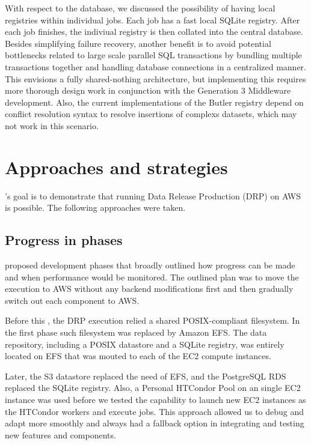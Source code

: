 With respect to the database, we discussed the possibility of having local registries within individual jobs.
Each job has a fast local SQLite registry.
After each job finishes, the indiviual registry is then collated into the central database.
Besides simplifying failure recovery, another benefit is to avoid potential bottlenecks related to large scale parallel SQL transactions by bundling multiple transactions together and handling database connections in a centralized manner.
This envisions a fully shared-nothing architecture, but implementing this requires more thorough design work in conjunction with the Generation 3 Middleware development.
Also, the current implementations of the Butler registry depend on conflict resolution syntax to resolve insertions of complexs datasets, which may not work in this scenario.


\section{Approaches and strategies}

\poc's goal is to demonstrate that running Data Release Production (DRP) on AWS is possible.
The following approaches were taken.

\subsection{Progress in phases}

 proposed development phases that broadly outlined how progress can be made and when performance would be monitored. The outlined plan was to move the execution to AWS without any backend modifications first and then gradually switch out each component to AWS.

Before this \poc, the DRP execution relied a shared POSIX-compliant filesystem.
In the first phase such filesystem was replaced by Amazon EFS.
The data repository, including a POSIX datastore and a SQLite registry, was entirely located on EFS that was mouted to each of the EC2 compute instances.

Later, the S3 datastore replaced the need of EFS, and the PostgreSQL RDS replaced the SQLite registry.
Also, a Personal HTCondor Pool on an single EC2 instance was used before we tested the capability to launch new EC2 instances as the HTCondor workers and execute jobs.
This approach allowed us to debug and adapt more smoothly and always had a fallback option in integrating and testing new features and components.

